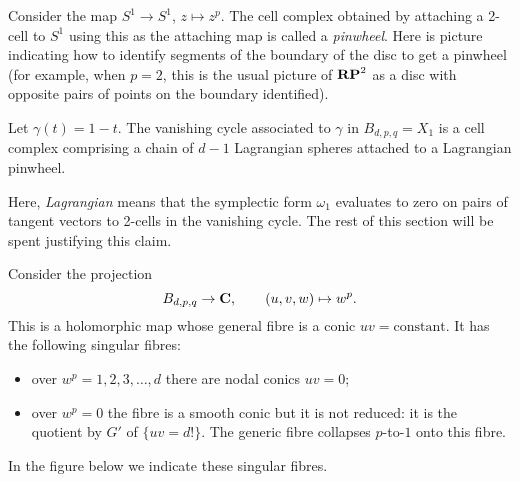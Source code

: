 \documentclass{article}
\begin{document}
\begin{Definition}
Consider the map \(S^1\to S^1\), \(z\mapsto z^p\). The cell complex
obtained by attaching a 2-cell to \(S^1\) using this as the
attaching map is called a {\em pinwheel}. Here is picture indicating
how to identify segments of the boundary of the disc to get a
pinwheel (for example, when \(p=2\), this is the usual picture of
\(\mathbf{RP}^{2}\) as a disc with opposite pairs of points on the boundary
identified).


\end{Definition}
\begin{center}
\end{center}
\begin{Proposition}
Let \(\gamma(t)=1-t\). The vanishing cycle associated to \(\gamma\)
in \(B_{d,p,q}=X_1\) is a cell complex comprising a chain of \(d-1\)
Lagrangian spheres attached to a Lagrangian pinwheel.


\end{Proposition}
Here, {\em Lagrangian} means that the symplectic form \(\omega_1\)
evaluates to zero on pairs of tangent vectors to 2-cells in the
vanishing cycle. The rest of this section will be spent justifying
this claim.


Consider the projection
\begin{equation}\label{eq:conicfib}B_{d,p,q}\to\mathbf{C},\qquad
(u,v,w)\mapsto w^p.\end{equation} This is a holomorphic map whose
general fibre is a conic \(uv=\mbox{constant}\). It has the following
singular fibres:
\begin{itemize}
\item over \(w^p=1,2,3,\ldots,d\) there are nodal conics \(uv=0\);
\item over \(w^p=0\) the fibre is a smooth conic but it is not reduced: it
is the quotient by \(G'\) of \(\{uv=d!\}\). The generic fibre
collapses \(p\)-to-\(1\) onto this fibre.
\end{itemize}
In the figure below we indicate these singular fibres.
\end{document}
